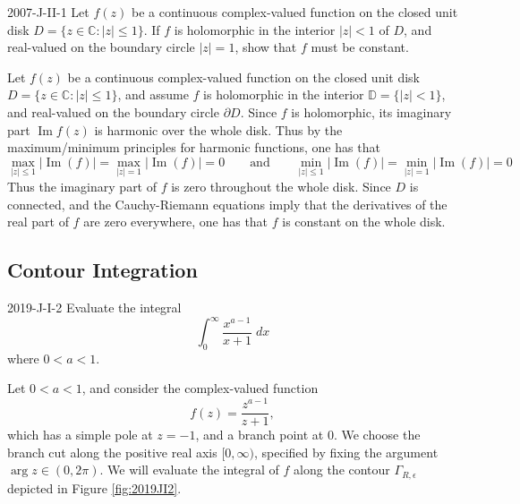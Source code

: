 \documentclass{article}
\begin{document}
	\begin{prb}{2007-J-II-1}
		Let $f(z)$ be a continuous complex-valued function on the closed unit disk $D = \{z \in \mathbb{C}: |z| \leq 1\}$. If $f$ is holomorphic in the interior $|z| < 1$ of $D$, and real-valued on the boundary circle $|z| = 1$, show that $f$ must be constant. 
	\end{prb}
	Let $f(z)$ be a continuous complex-valued function on the closed unit disk $D = \{z \in\mathbb{C}: |z| \leq 1\}$, and assume $f$ is holomorphic in the interior $\mathbb{D} = \{|z| < 1\}$, and real-valued on the boundary circle $\partial D$. Since $f$ is holomorphic, its imaginary part $\operatorname{Im}{f(z)}$ is harmonic over the whole disk. Thus by the maximum/minimum principles for harmonic functions, one has that 
	\begin{equation*}
		\max_{|z| \leq 1}|\operatorname{Im}(f)| = \max_{|z| = 1}|\operatorname{Im}(f)| = 0 \qquad \text{and} \qquad \min_{|z| \leq 1}|\operatorname{Im}(f)| = \min_{|z| = 1}|\operatorname{Im}(f)| = 0 
	\end{equation*}
	Thus the imaginary part of $f$ is zero throughout the whole disk. Since $D$ is connected, and the Cauchy-Riemann equations imply that the derivatives of the real part of $f$ are zero everywhere, one has that $f$ is constant on the whole disk. 
	
	\subsection{Contour Integration}
	
	\begin{prb}{2019-J-I-2}
		Evaluate the integral 
		\begin{equation*}
			\int_{0}^{\infty}\frac{x^{a-1}}{x + 1}\;dx
		\end{equation*}
		where $0 < a < 1$. 
	\end{prb}
	Let $0 < a < 1$, and consider the complex-valued function 
	\begin{equation*}
		f(z) = \frac{z^{a-1}}{z + 1}, 
	\end{equation*}
	which has a simple pole at $z = -1$, and a branch point at $0$. We choose the branch cut along the positive real axis $[0, \infty)$, specified by fixing the argument $\operatorname{arg}{z} \in (0,2\pi)$. We will evaluate the integral of $f$ along the contour $\Gamma_{R, \epsilon}$ depicted in Figure \ref{fig:2019JI2}. 
	
\end{document}
